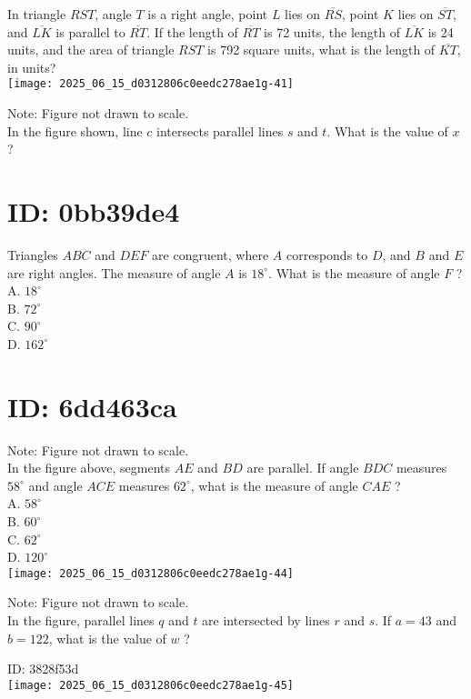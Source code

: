 In triangle $R S T$, angle $T$ is a right angle, point $L$ lies on $\overline{R S}$, point $K$ lies on $\overline{S T}$, and $\overline{L K}$ is parallel to $\overline{R T}$. If the length of $\overline{R T}$ is 72 units, the length of $\overline{L K}$ is 24 units, and the area of triangle $R S T$ is 792 square units, what is the length of $\overline{K T}$, in units?\\
\texttt{[image: 2025\_06\_15\_d0312806c0eedc278ae1g-41]}

Note: Figure not drawn to scale.\\
In the figure shown, line $c$ intersects parallel lines $s$ and $t$. What is the value of $x$ ?

\section*{ID: 0bb39de4}
Triangles $A B C$ and $D E F$ are congruent, where $A$ corresponds to $D$, and $B$ and $E$ are right angles. The measure of angle $A$ is $18^{\circ}$. What is the measure of angle $F$ ?\\
A. $18^{\circ}$\\
B. $72^{\circ}$\\
C. $90^{\circ}$\\
D. $162^{\circ}$

\section*{ID: 6dd463ca}
Note: Figure not drawn to scale.\\
In the figure above, segments $A E$ and $B D$ are parallel. If angle $B D C$ measures $58^{\circ}$ and angle $A C E$ measures $62^{\circ}$, what is the measure of angle $C A E$ ?\\
A. $58^{\circ}$\\
B. $60^{\circ}$\\
C. $62^{\circ}$\\
D. $120^{\circ}$\\
\texttt{[image: 2025\_06\_15\_d0312806c0eedc278ae1g-44]}

Note: Figure not drawn to scale.\\
In the figure, parallel lines $q$ and $t$ are intersected by lines $r$ and $s$. If $a=43$ and $b=122$, what is the value of $w$ ?

ID: 3828f53d\\
\texttt{[image: 2025\_06\_15\_d0312806c0eedc278ae1g-45]}

